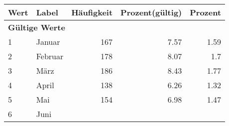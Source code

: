      \begin{longtable}{lXrrr}
     \toprule
     \textbf{Wert} & \textbf{Label} & \textbf{Häufigkeit} & \textbf{Prozent(gültig)} & \textbf{Prozent} \\
     \endhead
     \midrule
     \multicolumn{5}{l}{\textbf{Gültige Werte}}\\

     1 &
     \multicolumn{1}{X}{ Januar   } &


       \num{167} &
       \num[round-mode=places,round-precision=2]{7,57} &
         \num[round-mode=places,round-precision=2]{1,59} \\

     2 &
     \multicolumn{1}{X}{ Februar   } &


       \num{178} &
       \num[round-mode=places,round-precision=2]{8,07} &
         \num[round-mode=places,round-precision=2]{1,7} \\

     3 &
     \multicolumn{1}{X}{ März   } &


       \num{186} &
       \num[round-mode=places,round-precision=2]{8,43} &
         \num[round-mode=places,round-precision=2]{1,77} \\

     4 &
     \multicolumn{1}{X}{ April   } &


       \num{138} &
       \num[round-mode=places,round-precision=2]{6,26} &
         \num[round-mode=places,round-precision=2]{1,32} \\

     5 &
     \multicolumn{1}{X}{ Mai   } &


       \num{154} &
       \num[round-mode=places,round-precision=2]{6,98} &
         \num[round-mode=places,round-precision=2]{1,47} \\

     6 &
     \multicolumn{1}{X}{ Juni   } &



\end{longtable}
